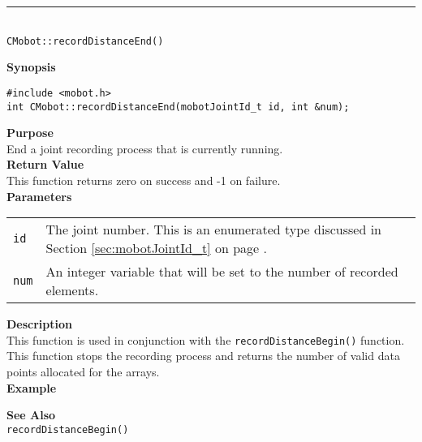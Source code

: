 \noindent
\vspace{5pt}
\rule{4.5in}{0.015in}\\
\noindent
{\LARGE \texttt{CMobot::recordDistanceEnd()}}\\
{}

\noindent
{\bf Synopsis}
\vspace{-8pt}
\begin{verbatim}
#include <mobot.h>
int CMobot::recordDistanceEnd(mobotJointId_t id, int &num);
\end{verbatim}

\noindent
{\bf Purpose}\\
End a joint recording process that is currently running.\\

\noindent
{\bf Return Value}\\
This function returns zero on success and -1 on failure.\\

\noindent
{\bf Parameters}\\
\vspace{-0.1in}
\begin{description}
\item               
\begin{tabular}{p{15 mm}p{145 mm}}
\texttt{id} & The joint number. This is an enumerated type 
discussed in Section \ref{sec:mobotJointId_t} on page
\pageref{sec:mobotJointId_t}.\\
\texttt{num} & An integer variable that will be set to the number of recorded elements. \\
\end{tabular}
\end{description}

\noindent
{\bf Description}\\
This function is used in conjunction with the \texttt{recordDistanceBegin()} function. 
This function stops the recording process and returns the number of valid data points
allocated for the arrays.\\

\noindent
{\bf Example}\\
\noindent

\noindent
{\bf See Also}\\
\texttt{recordDistanceBegin()} \\
